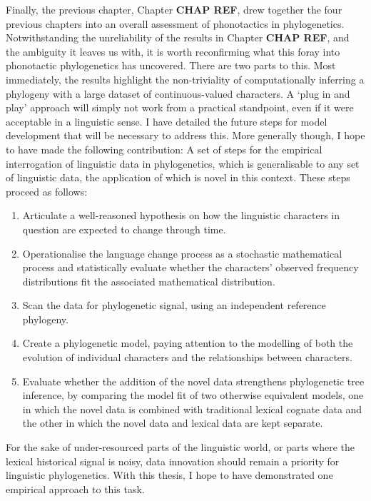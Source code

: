 Finally, the previous chapter, Chapter \textbf{CHAP REF}, drew together the four previous chapters into an overall assessment of phonotactics in phylogenetics. Notwithstanding the unreliability of the results in Chapter \textbf{CHAP REF}, and the ambiguity it leaves us with, it is worth reconfirming what this foray into phonotactic phylogenetics has uncovered. There are two parts to this. Most immediately, the results highlight the non-triviality of computationally inferring a phylogeny with a large dataset of continuous-valued characters. A `plug in and play' approach will simply not work from a practical standpoint, even if it were acceptable in a linguistic sense. I have detailed the future steps for model development that will be necessary to address this. More generally though, I hope to have made the following contribution: A set of steps for the empirical interrogation of linguistic data in phylogenetics, which is generalisable to any set of linguistic data, the application of which is novel in this context. These steps proceed as follows:

\begin{enumerate}
\def\labelenumi{(\arabic{enumi})}
\tightlist
\item
  Articulate a well-reasoned hypothesis on how the linguistic characters in question are expected to change through time.
\item
  Operationalise the language change process as a stochastic mathematical process and statistically evaluate whether the characters' observed frequency distributions fit the associated mathematical distribution.
\item
  Scan the data for phylogenetic signal, using an independent reference phylogeny.
\item
  Create a phylogenetic model, paying attention to the modelling of both the evolution of individual characters and the relationships between characters.
\item
  Evaluate whether the addition of the novel data strengthens phylogenetic tree inference, by comparing the model fit of two otherwise equivalent models, one in which the novel data is combined with traditional lexical cognate data and the other in which the novel data and lexical data are kept separate.
\end{enumerate}

For the sake of under-resourced parts of the linguistic world, or parts where the lexical historical signal is noisy, data innovation should remain a priority for linguistic phylogenetics. With this thesis, I hope to have demonstrated one empirical approach to this task.

